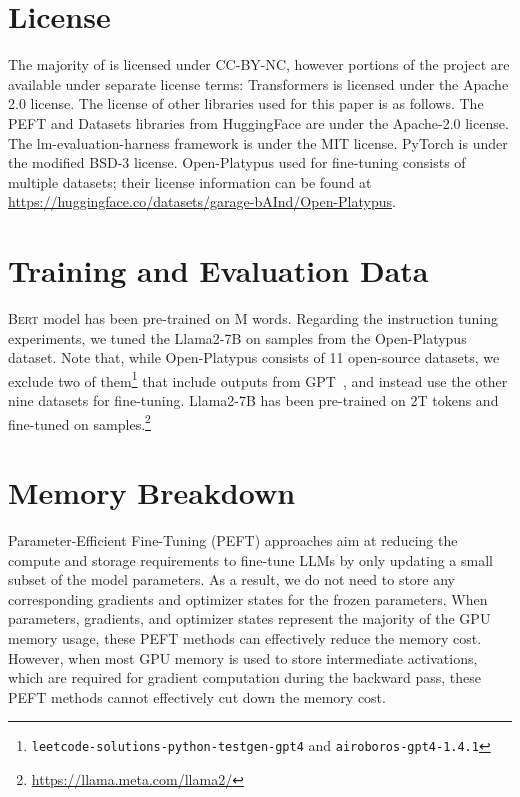 \section{License}\label{sec:app:license}
The majority of \method is licensed under CC-BY-NC, however portions of the project are available under separate license terms: Transformers is licensed under the Apache 2.0 license.
The license of other libraries used for this paper is as follows.
The PEFT and Datasets libraries from HuggingFace are under the Apache-2.0 license.
The lm-evaluation-harness framework is under the MIT license.
PyTorch is under the modified BSD-3 license.
Open-Platypus used for fine-tuning consists of multiple datasets; their license information can be found at \url{https://huggingface.co/datasets/garage-bAInd/Open-Platypus}.

\section{Training and Evaluation Data} \label{data}

\textsc{Bert} model has been pre-trained on M words.
Regarding the instruction tuning experiments, we tuned the \mbox{Llama2-7B} on  samples from the Open-Platypus~\citep{lee_23} dataset. Note that, while Open-Platypus consists of 11 open-source datasets, 
we exclude two of them\footnote{\texttt{leetcode-solutions-python-testgen-gpt4} and \texttt{airoboros-gpt4-1.4.1}} that include outputs from GPT~\cite{DBLP:journals/corr/abs-2303-08774}, and instead use the other nine datasets for fine-tuning. Llama2-7B has been pre-trained on 2T tokens and fine-tuned on  samples.\footnote{\url{https://llama.meta.com/llama2/}}



\section{Memory Breakdown}\label{sec:app:memorycomplexity:bkd}


Parameter-Efficient Fine-Tuning (PEFT) approaches aim at reducing the compute and storage requirements to fine-tune LLMs by only updating a small subset of the model parameters. 
As a result, we do not need to store any corresponding gradients and optimizer states for the frozen parameters. 
When parameters, gradients, and optimizer states represent the majority of the GPU memory usage,
these PEFT methods can effectively reduce the memory cost.
However, when most GPU memory is used to store intermediate activations, 
which are required for gradient computation during the backward pass, 
these PEFT methods cannot effectively cut down the memory cost.



